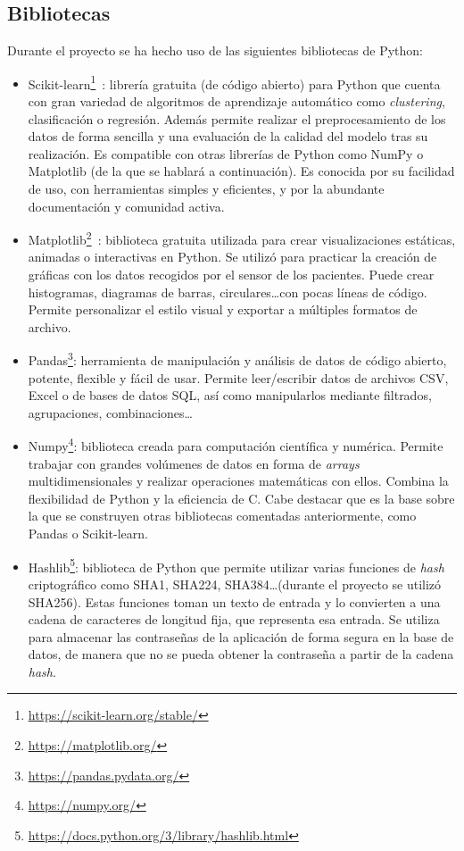 \subsection{Bibliotecas}
Durante el proyecto se ha hecho uso de las siguientes bibliotecas de Python:
\begin{itemize}
    \item Scikit-learn\footnote{\url{https://scikit-learn.org/stable/}}~\cite{alcalaScikit}: librería gratuita (de código abierto) para Python que cuenta con gran variedad de algoritmos de aprendizaje automático como \textit{clustering}, clasificación o regresión. Además permite realizar el preprocesamiento de los datos de forma sencilla y una evaluación de la calidad del modelo tras su realización. Es compatible con otras librerías de Python como NumPy o Matplotlib (de la que se hablará a continuación). Es conocida por su facilidad de uso, con herramientas simples y eficientes, y por la abundante documentación y comunidad activa.
    
    \item Matplotlib\footnote{\url{https://matplotlib.org/}}~\cite{matplotlib}: biblioteca gratuita utilizada para crear visualizaciones estáticas, animadas o interactivas en Python. Se utilizó para practicar la creación de gráficas con los datos recogidos por el sensor de los pacientes. Puede crear histogramas, diagramas de barras, circulares\ldots con pocas líneas de código. Permite personalizar el estilo visual y exportar a múltiples formatos de archivo.
    
    \item Pandas\footnote{\url{https://pandas.pydata.org/}}: herramienta de manipulación y análisis de datos de código abierto, potente, flexible y fácil de usar. Permite leer/escribir datos de archivos CSV, Excel o de bases de datos SQL, así como manipularlos mediante filtrados, agrupaciones, combinaciones\dots
    
    \item Numpy\footnote{\url{https://numpy.org/}}: biblioteca creada para computación científica y numérica. Permite trabajar con grandes volúmenes de datos en forma de \textit{arrays} multidimensionales y realizar operaciones matemáticas con ellos. Combina la flexibilidad de Python y la eficiencia de C. Cabe destacar que es la base sobre la que se construyen otras bibliotecas comentadas anteriormente, como Pandas o Scikit-learn.
    
    \item Hashlib\footnote{\url{https://docs.python.org/3/library/hashlib.html}}: biblioteca de Python que permite utilizar varias funciones de \textit{hash} criptográfico como SHA1, SHA224, SHA384\ldots(durante el proyecto se utilizó SHA256). Estas funciones toman un texto de entrada y lo convierten a una cadena de caracteres de longitud fija, que representa esa entrada. Se utiliza para almacenar las contraseñas de la aplicación de forma segura en la base de datos, de manera que no se pueda obtener la contraseña a partir de la cadena \textit{hash}.
\end{itemize}


